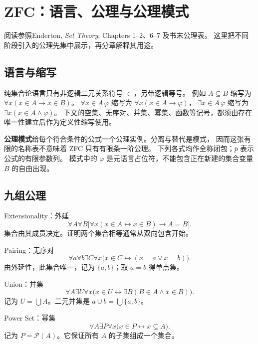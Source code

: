 \chapter{ZFC：语言、公理与公理模式}
\begin{qlnote}{阅读参照}Enderton, \emph{Set Theory}, Chapters 1--2、6--7 及书末公理表。
这里把不同阶段引入的公理先集中展示，再分章解释其用途。\end{qlnote}

\section{语言与缩写}
纯集合论语言只有非逻辑二元关系符号 \(\in\)，另带逻辑等号。
例如 \(A\subseteq B\) 缩写为 \(\forall x(x\in A\to x\in B)\)。
\(\forall x\in A\,\varphi\) 缩写为 \(\forall x(x\in A\to\varphi)\)，
\(\exists x\in A\,\varphi\) 缩写为 \(\exists x(x\in A\land\varphi)\)。
下文的空集、无序对、并集、幂集、函数等记号，都须由存在唯一性建立后作为定义性缩写使用。

\textbf{公理模式}给每个符合条件的公式一个公理实例。分离与替代是模式，
因而这张有限的名称表不意味着 ZFC 只有有限条一阶公理。
下列各式均作全称闭包；\(\bar p\) 表示公式的有限参数列。
模式中的 \(\varphi\) 是元语言占位符，不能包含正在新建的集合变量 \(B\) 的自由出现。

\section{九组公理}
\begin{axiom}{Extensionality：外延}
\[
 \forall A\forall B\bigl[\forall x(x\in A\leftrightarrow x\in B)\to A=B\bigr].
\]
集合由其成员决定。证明两个集合相等通常从双向包含开始。
\end{axiom}

\begin{axiom}{Pairing：无序对}
\[
 \forall a\forall b\exists C\forall x\bigl(x\in C\leftrightarrow(x=a\lor x=b)\bigr).
\]
由外延性，此集合唯一，记为 \(\{a,b\}\)；取 \(a=b\) 得单点集。
\end{axiom}

\begin{axiom}{Union：并集}
\[
 \forall A\exists U\forall x\bigl(x\in U\leftrightarrow\exists B(B\in A\land x\in B)\bigr).
\]
记为 \(U=\bigcup A\)。二元并集是 \(a\cup b=\bigcup\{a,b\}\)。
\end{axiom}

\begin{axiom}{Power Set：幂集}
\[
 \forall A\exists P\forall x\bigl(x\in P\leftrightarrow x\subseteq A\bigr).
\]
记为 \(P=\mathcal P(A)\)。它保证所有 \(A\) 的子集组成一个集合。
\end{axiom}

